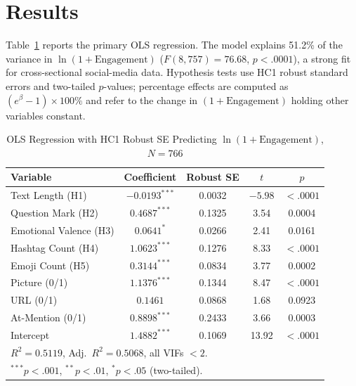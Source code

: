 \documentclass[12pt,a4paper]{article}
\begin{document}
\section{Results}

Table~\ref{tab:reg} reports the primary OLS regression. The model explains 51.2\% of the variance in $\ln(1+\text{Engagement})$ ($F(8,757)=76.68$, $p<.0001$), a strong fit for cross-sectional social-media data. Hypothesis tests use HC1 robust standard errors and two-tailed $p$-values; percentage effects are computed as $(e^{\beta}-1)\times 100\%$ and refer to the change in $(1+\text{Engagement})$ holding other variables constant.

\begin{table}[H]
\centering\small
\caption{OLS Regression with HC1 Robust SE Predicting $\ln(1+\text{Engagement})$, $N=766$}
\label{tab:reg}
\begin{tabular}{lcccc}
\toprule
Variable & Coefficient & Robust SE & $t$ & $p$ \\
\midrule
Text Length (H1) & $-0.0193^{***}$ & 0.0032 & $-5.98$ & $<.0001$ \\
Question Mark (H2) & $0.4687^{***}$ & 0.1325 & 3.54 & 0.0004 \\
Emotional Valence (H3) & $0.0641^{*}$ & 0.0266 & 2.41 & 0.0161 \\
Hashtag Count (H4) & $1.0623^{***}$ & 0.1276 & 8.33 & $<.0001$ \\
Emoji Count (H5) & $0.3144^{***}$ & 0.0834 & 3.77 & 0.0002 \\
Picture (0/1) & $1.1376^{***}$ & 0.1344 & 8.47 & $<.0001$ \\
URL (0/1) & $0.1461$ & 0.0868 & 1.68 & 0.0923 \\
At-Mention (0/1) & $0.8898^{***}$ & 0.2433 & 3.66 & 0.0003 \\
Intercept & $1.4882^{***}$ & 0.1069 & 13.92 & $<.0001$ \\
\midrule
\multicolumn{5}{l}{$R^2 = 0.5119$, Adj.\ $R^2 = 0.5068$, all VIFs $<2$.} \\
\multicolumn{5}{l}{$^{***}p<.001$, $^{**}p<.01$, $^{*}p<.05$ (two-tailed).} \\
\end{tabular}
\end{table}
\end{document}
